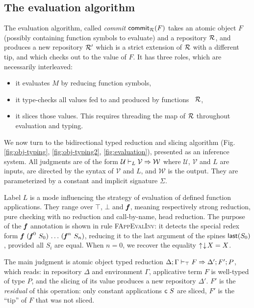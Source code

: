 \documentclass{llncs}
\begin{document}
\subsection{The evaluation algorithm}
\label{sec:eval}

The evaluation algorithm, called \emph{commit}
$\function{commit$_\mr$}{F}$ takes an atomic object $F$ (possibly
containing function symbols to evaluate) and a repository $\mr$, and
produces a new repository $\mr'$ which is a strict extension of $\mr$
with a different tip, and which checks out to the value of $F$. It has
three roles, which are necessarily interleaved:
\begin{itemize}
\item it evaluates $M$ by reducing function symbols,
\item it type-checks all values fed to and produced by functions \wrt\
  $\mr$,
\item it slices those values. This requires threading the map of $\mr$
  throughout evaluation and typing.
\end{itemize}

We now turn to the bidirectional typed reduction and slicing algorithm
(Fig. \ref{fig:obj-typing}, \ref{fig:obj-typing2},
\ref{fig:evaluation}), presented as an inference system. All judgments
are of the form $\gjao {L} {\mathcal U} {\mathcal V} {\mathcal W}$
where $\mathcal U$, $\mathcal V$ and $L$ are inputs, are directed by
the syntax of $\mathcal V$ and $L$, and $\mathcal W$ is the
output. They are parameterized by a constant and implicit signature
$\Sigma$.

Label $L$ is a mode influencing the strategy of evaluation of defined
function applications. They range over $\top$, $\bot$ and $\fct f$,
meaning respectively strong reduction, pure checking with no reduction
and call-by-name, head reduction. The purpose of the $\fct f$
annotation is shown in rule \textsc{FAppEvalInv}: it detects the
special redex form $\app{\fct f}\app {(\app{\fcti f
    0}S_0)}\app\ldots{(\app{\fcti f n} S_n)}$, reducing it to the last
argument of the spines $\function{last}{S_0}$, provided all $S_i$ are
equal. When $n=0$, we recover the equality $\finfer{\fget{X}} = X$.

The main judgment is atomic object typed reduction
$\jf\aeval\Delta\Gamma F {\Delta'} {F'} P$, which reads: in repository
$\Delta$ and environment $\Gamma$, applicative term $F$ is well-typed of
type $P$, and the slicing of its value produces a new repository
$\Delta'$. $F'$ is the \emph{residual} of this operation: only constant
applications $\app{\cst c} S$ are sliced, $F'$ is the ``tip'' of $F$
that was not sliced.
\end{document}
